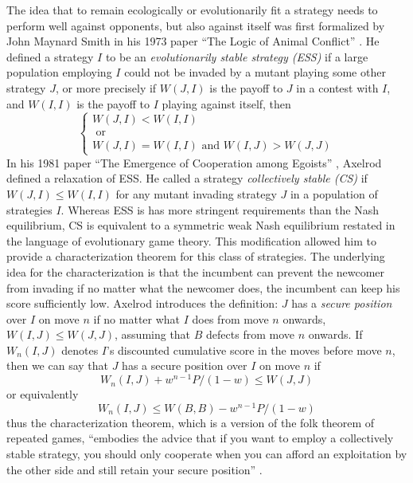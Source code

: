 The idea that to remain ecologically or evolutionarily fit a strategy needs to perform well against opponents, but also against itself was first formalized by John Maynard Smith in his 1973 paper ``The Logic of Animal Conflict'' \cite{MaynardSmith1973}. He defined a strategy $I$ to be an \textit{evolutionarily stable strategy (ESS)} if a large population employing $I$ could not be invaded by a mutant playing some other strategy $J$, or more precisely if $W(J, I)$ is the payoff to $J$ in a contest with $I$, and $W(I, I)$ is the payoff to $I$ playing against itself, then
\begin{equation} \label{eq:ESS}
\begin{cases} 
W(J, I) < W(I, I)\\
\textrm{ or}\\
W(J, I) = W(I, I) \textrm{ and } W(I, J) > W(J, J)
\end{cases}
\end{equation}
In his 1981 paper ``The Emergence of Cooperation among Egoists'' \cite{RobertAxelrod_1981}, Axelrod defined a relaxation of ESS. He called a strategy \textit{collectively stable (CS)} if $W(J, I) \leq W(I, I)$ for any mutant invading strategy $J$ in a population of strategies $I$. Whereas ESS is has more stringent requirements than the Nash equilibrium, CS is equivalent to a symmetric weak Nash equilibrium restated in the language of evolutionary game theory. This modification allowed him to provide a characterization theorem for this class of strategies. The underlying idea for the characterization is that the incumbent can prevent the newcomer from invading if no matter what the newcomer does, the incumbent can keep his score sufficiently low. Axelrod introduces the definition: $J$ has a \textit{secure position} over $I$ on move $n$ if no matter what $I$ does from move $n$ onwards, $W(I,J) \leq W(J,J)$, assuming that $B$ defects from move $n$ onwards. If $W_n(I,J)$ denotes $I$'s discounted cumulative score in the moves before move $n$, then we can say that $J$ has a secure position over $I$ on move $n$ if 
\[
W_n(I, J) + w^{n-1} P/(1-w) \leq W(J, J) 
\]
or equivalently
\begin{equation}\label{eq:secpos}
W_n(I, J) \leq  W(B, B) - w^{n-1} P/(1-w) 
\end{equation}
thus the characterization theorem, which is a version of the folk theorem of repeated games, ``embodies the advice that if you want to employ a collectively stable strategy, you should only cooperate when you can afford an exploitation by the other side and still retain your secure position'' \cite[p.313]{RobertAxelrod_1981}.

